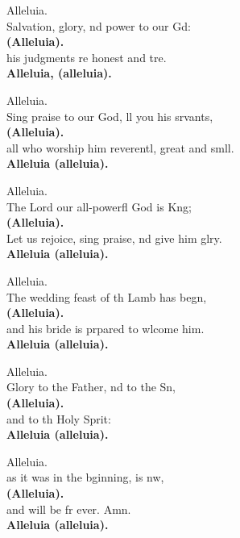 \settowidth{\versewidth}{all who worship him reverently, great and small   *}
\begin{psalmverse}%
  \begin{patverse}
Alleluia.\\
Salvation, glory, nd power to our Gd:\Med\\
\textbf{(Alleluia).}\\
his judgments re honest and tre.\Med\\
\textbf{Alleluia, (alleluia).}

Alleluia.\\
Sing praise to our God, ll you his srvants,\Med\\
\textbf{(Alleluia).}\\
all who worship him reverentl, great and smll.\Med\\
\textbf{Alleluia (alleluia).}

Alleluia.\\
The Lord our all-powerfl God is K\pointup{\i}ng;\Med\\
\textbf{(Alleluia).}\\
Let us rejoice, sing praise, nd give him glry.\Med\\
\textbf{Alleluia (alleluia).}

Alleluia.\\
The wedding feast of th Lamb has begn,\Med\\
\textbf{(Alleluia).}\\
and his bride is prpared to wlcome him.\Med\\
\textbf{Alleluia (alleluia).}

Alleluia.\\
Glory to the Father, nd to the Sn,\Med\\
\textbf{(Alleluia).}\\
and to th Holy Sp\pointup{\i}rit:\Med\\
\textbf{Alleluia (alleluia).}

Alleluia.\\
as it was in the bginning, is nw,\Med\\
\textbf{(Alleluia).}\\
and will be fr ever. Amn.\Med\\
\textbf{Alleluia (alleluia).}
  \end{patverse}
  \end{psalmverse}
